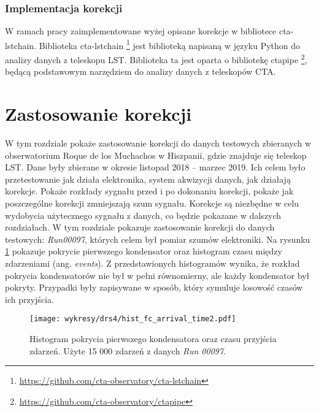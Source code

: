 \documentclass[a4paper,11pt,twoside]{article}
\begin{document}
\subsubsection{Implementacja korekcji}
W ramach pracy zaimplementowane wyżej opisane korekcje w bibliotece cta-lstchain. Biblioteka cta-lstchain  \footnote{\url{https://github.com/cta-observatory/cta-lstchain}} jest biblioteką napisaną w języku Python do analizy danych z teleskopu LST. Biblioteka ta jest oparta o bibliotekę ctapipe \footnote{\url{https://github.com/cta-observatory/ctapipe}}, będącą podstawowym narzędziem do analizy danych z teleskopów CTA.


\newpage
\section{Zastosowanie korekcji}
W tym rozdziale pokaże zastosowanie korekcji do danych testowych zbieranych w obserwatorium Roque de los Muchachos w Hiszpanii, gdzie znajduje się teleskop LST. Dane były zbierane w okresie listopad 2018 -- marzec 2019. Ich celem było przetestowanie jak działa elektronika, system akwizycji danych, jak działają korekcje. Pokaże rozkłady sygnału przed i po dokonaniu korekcji, pokaże jak poszczególne korekcji zmniejszają szum sygnału. Korekcje są niezbędne w celu wydobycia użytecznego sygnału z danych, co będzie pokazane w dalszych rozdziałach. W tym rozdziale pokazuje zastosowanie korekcji do danych testowych: \textsl{Run00097}, których celem był pomiar szumów elektroniki. Na rysunku \ref{fig:data_hist} pokazuje pokrycie pierwszego kondensator oraz histogram czasu między zdarzeniami (ang. \textsl{events}). Z przedstawionych histogramów wynika, że rozkład pokrycia kondensatorów nie był w pełni równomierny, ale każdy kondensator był pokryty.
Przypadki były zapisywane w sposób, który symuluje losowość czasów ich przyjścia. 
\begin{figure}[H] 
\centering
\texttt{[image: wykresy/drs4/hist\_fc\_arrival\_time2.pdf]}
\caption{Histogram pokrycia pierwszego kondensatora oraz czasu przyjścia zdarzeń. Użyte 15 000 zdarzeń z danych \textsl{Run 00097}.}
\label{fig:data_hist}
\end{figure}
\end{document}

